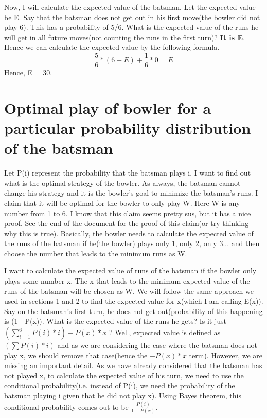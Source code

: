 \documentclass{article}
\begin{document}
Now, I will calculate the expected value of the batsman. Let the expected value be E. Say that the batsman does not get out in his first move(the bowler did not play 6). This has a probability of 5/6. What is the expected value of the runs he will get in all future moves(not counting the runs in the first turn)? \textbf{It is E}. Hence we can calculate the expected value by the following formula.
$$\frac{5}{6}*(6 + E) + \frac{1}{6}*0 = E$$
Hence, E = 30.


\section{Optimal play of bowler for a particular probability distribution of the batsman}
Let P(i) represent the probability that the batsman plays i. I want to find out what is the optimal strategy of the bowler. As always, the batsman cannot change his strategy and it is the bowler's goal to minimize the batsman's runs. I claim that it will be optimal for the bowler to only play W. Here W is any number from 1 to 6. I know that this claim seems pretty sus, but it has a nice proof. See the end of the document for the proof of this claim(or try thinking why this is true). Basically, the bowler needs to calculate the expected value of the runs of the batsman if he(the bowler) plays only 1, only 2, only 3... and then choose the number that leads to the minimum runs as W.

I want to calculate the expected value of runs of the batsman if the bowler only plays some number x. The x that leads to the minimum expected value of the runs of the batsman will be chosen as W. We will follow the same approach we used in sections 1 and 2 to find the expected value for x(which I am calling E(x)). Say on the batsman's first turn, he does not get out(probability of this happening is (1 - P(x)). What is the expected value of the runs he gets? Is it just $\left(\sum_{i = 1}^6P(i)*i\right) - P(x)*x$ ? Well, expected value is defined as $\left(\sum P(i)*i\right)$ and as we are considering the case where the batsman does not play x, we should remove that case(hence the $-P(x)*x$ term). However, we are missing an important detail. As we have already considered that the batsman has not played x, to calculate the expected value of his turn, we need to use the conditional probability(i.e. instead of P(i), we need the probability of the batsman playing i given that he did not play x). Using Bayes theorem, this conditional probability comes out to be $\frac{P(i)}{1 - P(x)}$.
\end{document}
